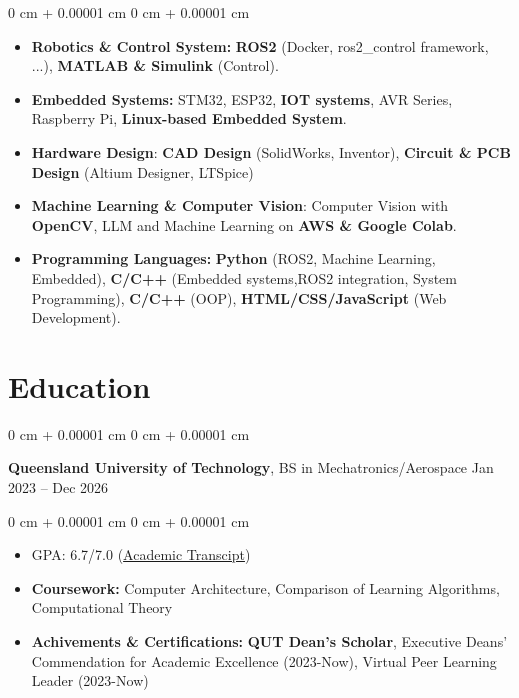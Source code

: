 \documentclass[10pt, letterpaper]{article}
\newenvironment{highlights}{
    \begin{itemize}[
        topsep=0.10 cm,
        parsep=0.10 cm,
        partopsep=0pt,
        itemsep=0pt,
        leftmargin=0 cm + 10pt
    ]
}{
    \end{itemize}
} %
\newenvironment{highlightsforbulletentries}{
    \begin{itemize}[
        topsep=0.10 cm,
        parsep=0.10 cm,
        partopsep=0pt,
        itemsep=0pt,
        leftmargin=10pt
    ]
}{
    \end{itemize}
} %
\newenvironment{onecolentry}{
    \begin{adjustwidth}{
        0 cm + 0.00001 cm
    }{
        0 cm + 0.00001 cm
    }
}{
    \end{adjustwidth}
} %
\newenvironment{twocolentry}[2][]{
    \onecolentry
    \def\secondColumn{#2}
    \setcolumnwidth{\fill, 4.5 cm}
    \begin{paracol}{2}
}{
    \switchcolumn \raggedleft \secondColumn
    \end{paracol}
    \endonecolentry
} %
\begin{document}
\begin{onecolentry}
      \begin{highlightsforbulletentries}

            \item \textbf{Robotics \& Control System:} \textbf{ROS2} (Docker, ros2\_control framework, ...), \textbf{MATLAB \& Simulink} (Control).
            \item \textbf{Embedded Systems:} STM32, ESP32, \textbf{IOT systems}, AVR Series, Raspberry Pi, \textbf{Linux-based Embedded System}.
            \item \textbf{Hardware Design}: \textbf{CAD Design} (SolidWorks, Inventor), \textbf{Circuit \& PCB Design} (Altium Designer, LTSpice)
            \item \textbf{Machine Learning \& Computer Vision}: Computer Vision with \textbf{OpenCV},
            LLM and Machine Learning on \textbf{AWS \& Google Colab}.
            \item \textbf{Programming Languages:} \textbf{Python} (ROS2, Machine Learning, Embedded),
            \textbf{C/C++} (Embedded systems,ROS2 integration, System Programming), \textbf{C/C++} (OOP),
            \textbf{HTML/CSS/JavaScript} (Web Development).

      \end{highlightsforbulletentries}
\end{onecolentry}

\section{Education}

\begin{twocolentry}{
            Jan 2023 – Dec 2026
      }
      \textbf{Queensland University of Technology}, BS in Mechatronics/Aerospace\end{twocolentry}

\vspace{0.10 cm}
\begin{onecolentry}
      \begin{highlights}
            \item GPA: 6.7/7.0 (\href{https://sites.google.com/view/kelvincv/academic-transcript?authuser=0}{Academic Transcipt})
            \item \textbf{Coursework:} Computer Architecture, Comparison of Learning Algorithms, Computational Theory
            \item \textbf{Achivements \& Certifications:} \textbf{QUT Dean's Scholar},
            Executive Deans' Commendation for Academic Excellence (2023-Now),
            Virtual Peer Learning Leader (2023-Now)

      \end{highlights}
\end{onecolentry}
\end{document}
